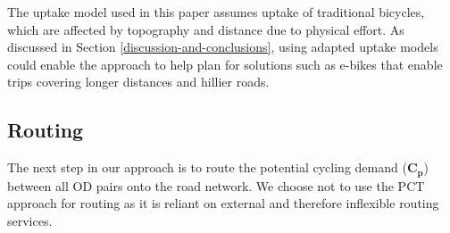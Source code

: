 \documentclass[
]{article}
\begin{document}
The uptake model used in this paper assumes uptake of traditional bicycles, which are affected by topography and distance due to physical effort.
As discussed in Section \ref{discussion-and-conclusions}, using adapted uptake models could enable the approach to help plan for solutions such as e-bikes that enable trips covering longer distances and hillier roads.

\hypertarget{routing}{%
\subsection{Routing}\label{routing}}

The next step in our approach is to route the potential cycling demand (\(\boldsymbol{C_{p}}\)) between all OD pairs onto the road network.
We choose not to use the PCT approach for routing as it is reliant on external and therefore inflexible routing services.
\end{document}
